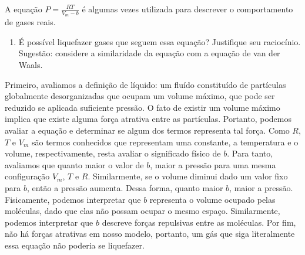 \begin{xcs}
    A equação \( P = \frac{RT}{V_m - b} \) é algumas vezes utilizada para
    descrever o comportamento de gases reais. 
    \begin{enumerate}[label=\alph*.]
        \item É possível liquefazer gases que seguem essa equação? Justifique
            seu raciocínio. Sugestão: considere a similaridade da equação com a
            equação de van der Waals. 
    \end{enumerate}
\end{xcs}
\begin{rsl}
    Primeiro, avaliamos a definição de líquido: um fluído constituído de
    partículas globalmente desorganizadas que ocupam um volume máximo, que pode
    ser reduzido se aplicada suficiente pressão. O fato de existir um volume
    máximo implica que existe alguma força atrativa entre as partículas.
    Portanto, podemos avaliar a equação e determinar se algum dos termos
    representa tal força.  Como $R$, $T$ e $V_m$ são termos conhecidos que
    representam uma constante, a temperatura e o volume, respectivamente, resta
    avaliar o significado físico de $b$. Para tanto, avaliamos que quanto maior
    o valor de $b$, maior a pressão para uma mesma configuração $V_m$, $T$ e
    $R$. Similarmente, se o volume diminui dado um valor fixo para $b$, então a
    pressão aumenta. Dessa forma, quanto maior $b$, maior a pressão.
    Fisicamente, podemos interpretar que $b$ representa o volume ocupado pelas
    moléculas, dado que elas não possam ocupar o mesmo espaço. Similarmente,
    podemos interpretar que $b$ descreve forças repulsivas entre as moléculas.
    Por fim, não há forças atrativas em nosso modelo, portanto, um gás que siga
    literalmente essa equação não poderia se liquefazer.      

\end{rsl}
